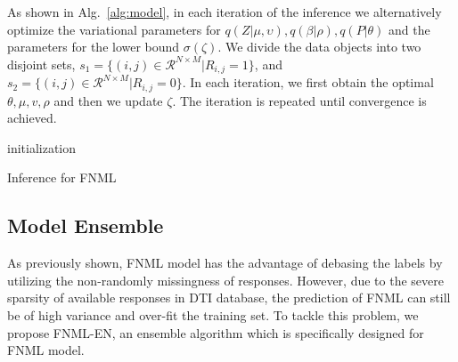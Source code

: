 \documentclass[conference]{IEEEtran}
\begin{document}
As shown in Alg.~\ref{alg:model}, in each iteration of the inference we alternatively optimize the variational parameters for $q(Z|\mu,\upsilon),q(\beta|\rho), q(P|\theta)$ and the parameters for the lower bound $\sigma(\zeta)$. We divide the data objects into two disjoint sets, $s_1 = \{(i,j)\in \mathcal{R}^{N\times M}|R_{i,j}=1\}$, and $s_2= \{(i,j)\in \mathcal{R}^{N\times M}|R_{i,j}=0\}$. In each iteration, we first obtain the optimal $\theta,\mu,v,\rho$ and then we update $\zeta$. The iteration is repeated until convergence is achieved.

\begin{algorithm}
    \Output{$\mu$, $\upsilon$, $\rho$, $\theta$, $\zeta$}
    initialization\;
    \caption{Inference for FNML}\label{alg:model}
\end{algorithm}

\subsection{Model Ensemble}
As previously shown, FNML model has the advantage of debasing the labels by utilizing the non-randomly missingness of responses. However, due to the severe sparsity of available responses in DTI database, the prediction of FNML can still be of high variance and over-fit the training set. To tackle this problem, we propose FNML-EN, an ensemble algorithm which is specifically designed for FNML model.
\end{document}
